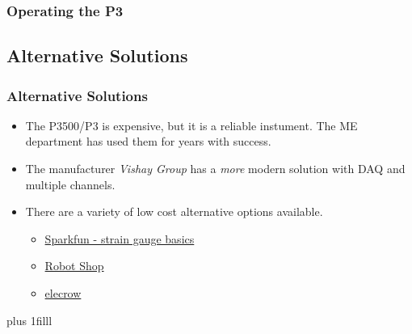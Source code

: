 \documentclass[fleqn]{beamer} %
\newcommand{\sectionIIIsubsectionIIItitle}{Operating the P3}
\newcommand{\sectionIIIsubsectionIVtitle}{Alternative Solutions}
\newcommand{\btVFill}{\vskip0pt plus 1filll}
\begin{document}
			\begin{frame}[containsverbatim]
				\frametitle{\sectionIIIsubsectionIIItitle}\scriptsize
			

			
			\end{frame}

		\subsection{\sectionIIIsubsectionIVtitle}\label{sectionIIIsubsectionIV}	
		
		\begin{frame} \scriptsize
		\frametitle{\sectionIIIsubsectionIVtitle}
		\bigskip


			\begin{itemize}

			\item The P3500/P3 is expensive, but it is a reliable instument. The ME department has used them for years with success. \vspc

			\item The manufacturer {\it Vishay Group} has a {\it more} modern solution with DAQ and multiple channels. \vspc

			\item There are a variety of low cost alternative options available.

			\begin{itemize}
			\item \href{https://learn.sparkfun.com/tutorials/getting-started-with-load-cells/strain-gauge-basics}{Sparkfun - strain gauge basics}
			\item \href{https://www.robotshop.com/en/strain-gauge-load-cell-amplifier-shield-2ch.html}{Robot Shop}

			\item \href{https://www.elecrow.com/strain-gauge-module-p-735.html}{elecrow}
			\end{itemize}

			\end{itemize}


		\btVFill

		\end{frame}
	
\end{document}
